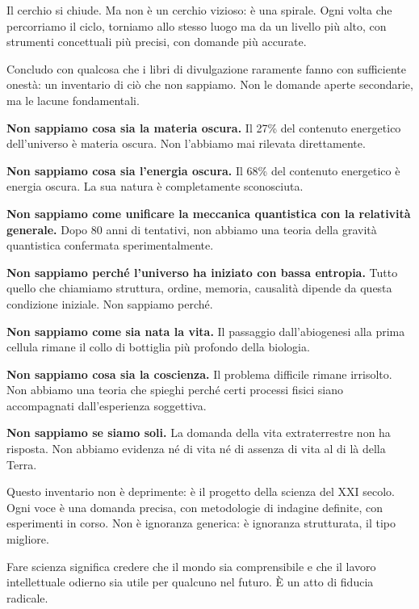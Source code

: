 \documentclass[12pt,a4paper,openany]{book}
\newcommand{\sezione}[1]{\vspace{1.2em}{\large\bfseries #1}\vspace{0.5em}\par}
\begin{document}
Il cerchio si chiude. Ma non è un cerchio vizioso: è una spirale. Ogni volta che percorriamo il ciclo, torniamo allo stesso luogo ma da un livello più alto, con strumenti concettuali più precisi, con domande più accurate.

\sezione{Quello che non sappiamo: un inventario onesto}

Concludo con qualcosa che i libri di divulgazione raramente fanno con sufficiente onestà: un inventario di ciò che non sappiamo. Non le domande aperte secondarie, ma le lacune fondamentali.

\textbf{Non sappiamo cosa sia la materia oscura.} Il 27\% del contenuto energetico dell'universo è materia oscura. Non l'abbiamo mai rilevata direttamente.

\textbf{Non sappiamo cosa sia l'energia oscura.} Il 68\% del contenuto energetico è energia oscura. La sua natura è completamente sconosciuta.

\textbf{Non sappiamo come unificare la meccanica quantistica con la relatività generale.} Dopo 80 anni di tentativi, non abbiamo una teoria della gravità quantistica confermata sperimentalmente.

\textbf{Non sappiamo perché l'universo ha iniziato con bassa entropia.} Tutto quello che chiamiamo struttura, ordine, memoria, causalità dipende da questa condizione iniziale. Non sappiamo perché.

\textbf{Non sappiamo come sia nata la vita.} Il passaggio dall'abiogenesi alla prima cellula rimane il collo di bottiglia più profondo della biologia.

\textbf{Non sappiamo cosa sia la coscienza.} Il problema difficile rimane irrisolto. Non abbiamo una teoria che spieghi perché certi processi fisici siano accompagnati dall'esperienza soggettiva.

\textbf{Non sappiamo se siamo soli.} La domanda della vita extraterrestre non ha risposta. Non abbiamo evidenza né di vita né di assenza di vita al di là della Terra.

Questo inventario non è deprimente: è il progetto della scienza del XXI secolo. Ogni voce è una domanda precisa, con metodologie di indagine definite, con esperimenti in corso. Non è ignoranza generica: è ignoranza strutturata, il tipo migliore.

\sezione{La scienza come atto di fiducia nel futuro}

Fare scienza significa credere che il mondo sia comprensibile e che il lavoro intellettuale odierno sia utile per qualcuno nel futuro. È un atto di fiducia radicale.
\end{document}
